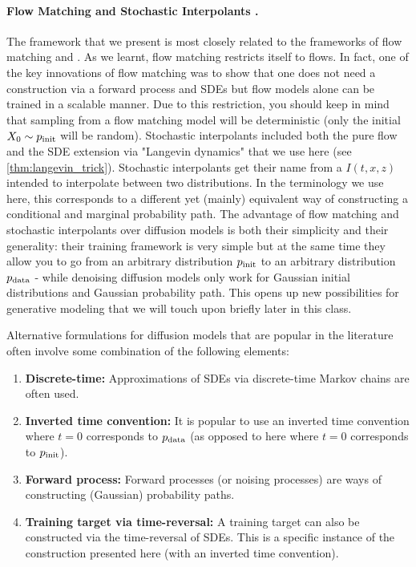 \paragraph{Flow Matching \citep{lipman2022flow} and Stochastic Interpolants \citep{albergo2023stochastic}.}  The framework that we present is most closely related to the frameworks of flow matching and . As we learnt, flow matching restricts itself to flows. In fact, one of the key innovations of flow matching was to show that one does not need a construction via a forward process and SDEs but flow models alone can be trained in a scalable manner. Due to this restriction, you should keep in mind that sampling from a flow matching model will be  deterministic (only the initial $X_0\sim p_{\rm{init}}$ will be random). Stochastic interpolants included both the pure flow and the SDE extension via "Langevin dynamics" that we use here (see \cref{thm:langevin_trick}). Stochastic interpolants get their name from a  $I(t,x,z)$ intended to interpolate between two distributions. In the terminology we use here, this corresponds to a different yet (mainly) equivalent way of constructing a conditional and marginal probability path. The advantage of flow matching and stochastic interpolants over diffusion models is both their simplicity and their generality: their training framework is very simple but at the same time they allow you to go from an arbitrary distribution $p_{\rm{init}}$ to an arbitrary distribution $p_{\rm{data}}$ - while denoising diffusion models only work for Gaussian initial distributions and  Gaussian probability path. This opens up new possibilities for generative modeling that we will touch upon briefly later in this class.

\begin{summarybox}
Alternative formulations for diffusion models that are popular in the literature often involve some combination of the following elements:
\begin{enumerate}
    \item \textbf{Discrete-time: }Approximations of SDEs via discrete-time Markov chains are often used.
    \item \textbf{Inverted time convention: }It is popular to use an inverted time convention where $t=0$ corresponds to $p_{\rm{data}}$ (as opposed to here where $t=0$ corresponds to $p_{\rm{init}}$).
    \item \textbf{Forward process: }Forward processes (or noising processes) are ways of constructing (Gaussian) probability paths.
    \item \textbf{Training target via time-reversal:} A training target can also be  constructed via the time-reversal of SDEs. This is a specific instance of the construction presented here (with an inverted time convention).
\end{enumerate}

\end{summarybox}